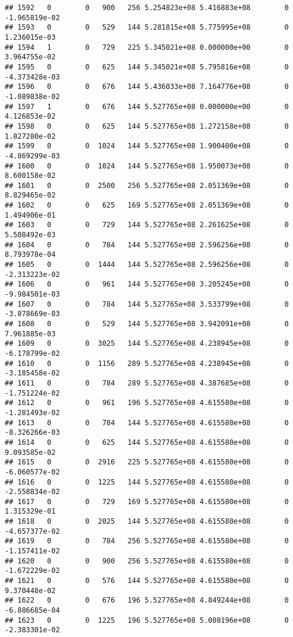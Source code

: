 \documentclass[
]{article}
\begin{document}
\begin{enumerate}
\begin{verbatim}
## 1592   0        0   900   256 5.254823e+08 5.416883e+08        0 -1.965819e-02
## 1593   0        0   529   144 5.281815e+08 5.775995e+08        0  1.236015e-03
## 1594   1        0   729   225 5.345021e+08 0.000000e+00        0  3.964755e-02
## 1595   0        0   625   144 5.345021e+08 5.795816e+08        0 -4.373428e-03
## 1596   0        0   676   144 5.436033e+08 7.164776e+08        0 -1.089838e-02
## 1597   1        0   676   144 5.527765e+08 0.000000e+00        0  4.126853e-02
## 1598   0        0   625   144 5.527765e+08 1.272158e+08        0  1.827280e-02
## 1599   0        0  1024   144 5.527765e+08 1.900400e+08        0 -4.869299e-03
## 1600   0        0  1024   144 5.527765e+08 1.950073e+08        0  8.600158e-02
## 1601   0        0  2500   256 5.527765e+08 2.051369e+08        0  8.829465e-02
## 1602   0        0   625   169 5.527765e+08 2.051369e+08        0  1.494906e-01
## 1603   0        0   729   144 5.527765e+08 2.261625e+08        0  5.508492e-03
## 1604   0        0   784   144 5.527765e+08 2.596256e+08        0  8.793978e-04
## 1605   0        0  1444   144 5.527765e+08 2.596256e+08        0 -2.313223e-02
## 1606   0        0   961   144 5.527765e+08 3.205245e+08        0 -9.984501e-03
## 1607   0        0   784   144 5.527765e+08 3.533799e+08        0 -3.878669e-03
## 1608   0        0   529   144 5.527765e+08 3.942091e+08        0  7.961885e-03
## 1609   0        0  3025   144 5.527765e+08 4.238945e+08        0 -6.178799e-02
## 1610   0        0  1156   289 5.527765e+08 4.238945e+08        0 -3.185458e-02
## 1611   0        0   784   289 5.527765e+08 4.387685e+08        0 -1.751224e-02
## 1612   0        0   961   196 5.527765e+08 4.615580e+08        0 -1.281493e-02
## 1613   0        0   784   144 5.527765e+08 4.615580e+08        0 -8.326266e-03
## 1614   0        0   625   144 5.527765e+08 4.615580e+08        0  9.093585e-02
## 1615   0        0  2916   225 5.527765e+08 4.615580e+08        0 -6.060577e-02
## 1616   0        0  1225   144 5.527765e+08 4.615580e+08        0 -2.558834e-02
## 1617   0        0   729   169 5.527765e+08 4.615580e+08        0  1.315329e-01
## 1618   0        0  2025   144 5.527765e+08 4.615580e+08        0 -4.657377e-02
## 1619   0        0   784   256 5.527765e+08 4.615580e+08        0 -1.157411e-02
## 1620   0        0   900   256 5.527765e+08 4.615580e+08        0 -1.672229e-02
## 1621   0        0   576   144 5.527765e+08 4.615580e+08        0  9.370448e-02
## 1622   0        0   676   196 5.527765e+08 4.849244e+08        0 -6.886685e-04
## 1623   0        0  1225   196 5.527765e+08 5.008196e+08        0 -2.383301e-02

\end{verbatim}
\end{enumerate}
\end{document}
